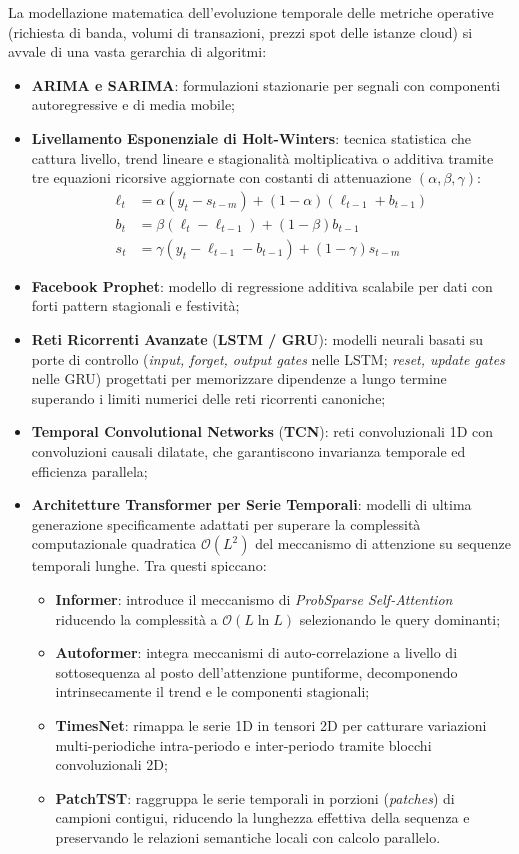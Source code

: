 \documentclass[11pt, a4paper]{article}
\begin{document}
La modellazione matematica dell'evoluzione temporale delle metriche operative (richiesta di banda, volumi di transazioni, prezzi spot delle istanze cloud) si avvale di una vasta gerarchia di algoritmi:
\begin{itemize}
    \item \textbf{ARIMA e SARIMA}: formulazioni stazionarie per segnali con componenti autoregressive e di media mobile;
    \item \textbf{Livellamento Esponenziale di Holt-Winters}: tecnica statistica che cattura livello, trend lineare e stagionalità moltiplicativa o additiva tramite tre equazioni ricorsive aggiornate con costanti di attenuazione $(\alpha, \beta, \gamma)$:
    \begin{align}
        \ell_t &= \alpha (y_t - s_{t-m}) + (1 - \alpha)(\ell_{t-1} + b_{t-1}) \\
        b_t &= \beta (\ell_t - \ell_{t-1}) + (1 - \beta) b_{t-1} \\
        s_t &= \gamma (y_t - \ell_{t-1} - b_{t-1}) + (1 - \gamma) s_{t-m}
    \end{align}
    \item \textbf{Facebook Prophet}: modello di regressione additiva scalabile per dati con forti pattern stagionali e festività;
    \item \textbf{Reti Ricorrenti Avanzate} (\textbf{LSTM / GRU}): modelli neurali basati su porte di controllo (\emph{input, forget, output gates} nelle LSTM; \emph{reset, update gates} nelle GRU) progettati per memorizzare dipendenze a lungo termine superando i limiti numerici delle reti ricorrenti canoniche;
    \item \textbf{Temporal Convolutional Networks} (\textbf{TCN}): reti convoluzionali 1D con convoluzioni causali dilatate, che garantiscono invarianza temporale ed efficienza parallela;
    \item \textbf{Architetture Transformer per Serie Temporali}: modelli di ultima generazione specificamente adattati per superare la complessità computazionale quadratica $\mathcal{O}(L^2)$ del meccanismo di attenzione su sequenze temporali lunghe. Tra questi spiccano:
    \begin{itemize}
        \item \textbf{Informer}: introduce il meccanismo di \emph{ProbSparse Self-Attention} riducendo la complessità a $\mathcal{O}(L \ln L)$ selezionando le query dominanti;
        \item \textbf{Autoformer}: integra meccanismi di auto-correlazione a livello di sottosequenza al posto dell'attenzione puntiforme, decomponendo intrinsecamente il trend e le componenti stagionali;
        \item \textbf{TimesNet}: rimappa le serie 1D in tensori 2D per catturare variazioni multi-periodiche intra-periodo e inter-periodo tramite blocchi convoluzionali 2D;
        \item \textbf{PatchTST}: raggruppa le serie temporali in porzioni (\emph{patches}) di campioni contigui, riducendo la lunghezza effettiva della sequenza e preservando le relazioni semantiche locali con calcolo parallelo.
    \end{itemize}
\end{itemize}
\end{document}
